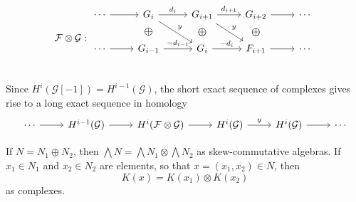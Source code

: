\[\mathcal{F}\otimes\mathcal{G}:\begin{tikzcd}
\cdots\ar[r]&G_i\ar[r,"d_i"]\ar[rd,"y"]\ar[draw=none]{d}[name=X, anchor=center,scale=1.5]{\oplus}&G_{i+1}\ar[draw=none]{d}[name=X, anchor=center,scale=1.5]{\oplus}\ar[r,"d_{i+1}"]\ar[rd,"y"]&G_{i+2}\ar[draw=none]{d}[name=X, anchor=center,scale=1.5]{\oplus}\ar[r]&\cdots\\
\cdots\ar[r]&G_{i-1}\ar[r,"-d_{i-1}"]&G_{i}\ar[r,"-d_i"]&F_{i+1}\ar[r]&\cdots\\
\end{tikzcd}\]
Since $H^i(\mathcal{G}[-1])=H^{i-1}(\mathcal{G})$, the short exact sequence of complexes gives rise to a long exact sequence in homology
\[\begin{tikzcd}
\cdots\ar[r]&H^{i-1}(\mathcal{G})\ar[r]&H^i(\mathcal{F}\otimes\mathcal{G})\ar[r]&H^i(\mathcal{G})\ar[r,"y"]&H^i(\mathcal{G})\ar[r]&\cdots
\end{tikzcd}\]
\begin{proposition}\label{Koszul tensor prod}
If $N=N_1\oplus N_2$, then $\bigwedge N=\bigwedge N_1\otimes\bigwedge N_2$ as skew-commutative algebras. If $x_1\in N_1$ and $x_2\in N_2$ are elements, so that $x=(x_1,x_2)\in N$, then
\[K(x)=K(x_1)\otimes K(x_2)\]
as complexes.
\end{proposition}
